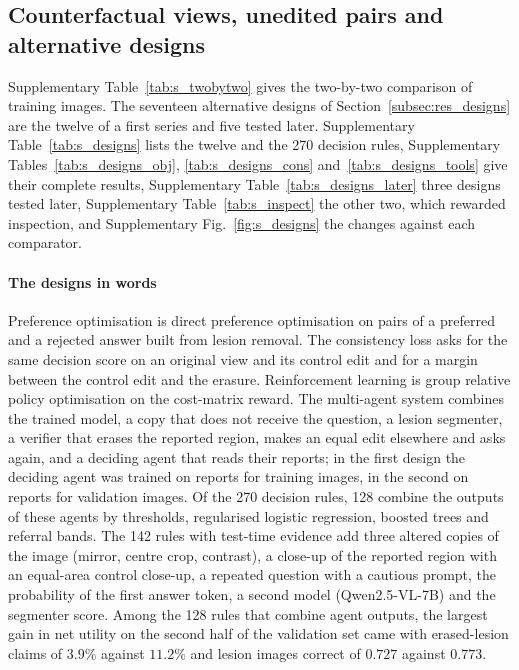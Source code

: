 \clearpage
\subsection{Counterfactual views, unedited pairs and alternative designs}
\label{subsec:s_designs}

Supplementary Table~\ref{tab:s_twobytwo} gives the two-by-two comparison of training images. The seventeen alternative designs of Section~\ref{subsec:res_designs} are the twelve of a first series and five tested later. Supplementary Table~\ref{tab:s_designs} lists the twelve and the 270 decision rules, Supplementary Tables~\ref{tab:s_designs_obj}, \ref{tab:s_designs_cons} and~\ref{tab:s_designs_tools} give their complete results, Supplementary Table~\ref{tab:s_designs_later} three designs tested later, Supplementary Table~\ref{tab:s_inspect} the other two, which rewarded inspection, and Supplementary Fig.~\ref{fig:s_designs} the changes against each comparator.

\paragraph{The designs in words} Preference optimisation is direct preference optimisation \citep{rafailov2023dpo} on pairs of a preferred and a rejected answer built from lesion removal. The consistency loss asks for the same decision score on an original view and its control edit and for a margin between the control edit and the erasure. Reinforcement learning is group relative policy optimisation \citep{shao2024deepseekmath} on the cost-matrix reward. The multi-agent system combines the trained model, a copy that does not receive the question, a lesion segmenter, a verifier that erases the reported region, makes an equal edit elsewhere and asks again, and a deciding agent that reads their reports; in the first design the deciding agent was trained on reports for training images, in the second on reports for validation images. Of the 270 decision rules, 128 combine the outputs of these agents by thresholds, regularised logistic regression, boosted trees and referral bands. The 142 rules with test-time evidence add three altered copies of the image (mirror, centre crop, contrast), a close-up of the reported region with an equal-area control close-up, a repeated question with a cautious prompt, the probability of the first answer token, a second model (Qwen2.5-VL-7B) and the segmenter score. Among the 128 rules that combine agent outputs, the largest gain in net utility on the second half of the validation set came with erased-lesion claims of $3.9\%$ against $11.2\%$ and lesion images correct of $0.727$ against $0.773$.


